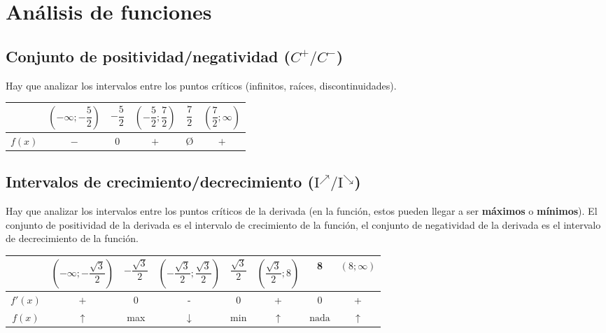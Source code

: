 \section{Análisis de funciones}


\subsection*{Conjunto de positividad/negatividad ($C^+/C^-$)}

Hay que analizar los intervalos entre los puntos críticos (infinitos, raíces, discontinuidades).

{\renewcommand{\arraystretch}{1.25}
\begin{table}[H]
\centering
\begin{tabular}{|c|c|c|c|c|c|}
\hline
& 
\multicolumn{1}{c|}{$\left(-\infty ; -\dfrac{5}{2}\right)$} & 
\multicolumn{1}{c|}{$-\dfrac{5}{2}$} & 
\multicolumn{1}{c|}{$\left(-\dfrac{5}{2}; \dfrac{7}{2}\right)$} & 
$\dfrac{7}{2}$ & 
$\left(\dfrac{7}{2};\infty\right)$ \\ \hline
$f(x)$&    $-$                 &    0                   &         $+$              & \O & $+$ \\ \hline
\end{tabular}
\end{table}
}


\subsection*{Intervalos de crecimiento/decrecimiento ($\text{I}^\nearrow/ \text{I}^\searrow$)}

Hay que analizar los intervalos entre los puntos críticos de la derivada (en la función, estos pueden llegar a ser \textbf{máximos} o \textbf{mínimos}). El conjunto de positividad de la derivada es el intervalo de crecimiento de la función, el conjunto de negatividad de la derivada es el intervalo de decrecimiento de la función.

{\renewcommand{\arraystretch}{1.25}
\begin{table}[H]
\centering
\begin{tabular}{|c|c|c|c|c|c|c|c|}
\hline
&
\multicolumn{1}{c|}{$\left(-\infty ; -\dfrac{\sqrt{3}}{2}\right)$} & 
\multicolumn{1}{c|}{$-\dfrac{\sqrt{3}}{2}$} & 
\multicolumn{1}{c|}{$\left(-\dfrac{\sqrt{3}}{2}; \dfrac{\sqrt{3}}{2}\right)$} & 
$\dfrac{\sqrt{3}}{2}$ & 
$\left(\dfrac{\sqrt{3}}{2};8\right)$ & 8 & $(8; \infty)$\\ \hline
$f'(x)$ & $+$ & 0 & - & 0 & + & 0& +\\ \hline
$f(x)$&  $\uparrow$ & max & $\downarrow$ & min & $\uparrow$ & $\text{nada}$ & $\uparrow$\\ \hline
\end{tabular}
\end{table}
}



